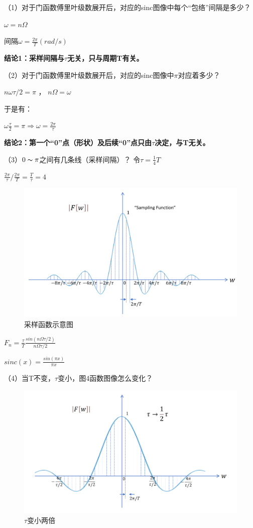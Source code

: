 \documentclass[UTF8]{ctexart}
\begin{document}
（1）对于门函数傅里叶级数展开后，对应的sinc图像中每个“包络”间隔是多少？\par
$\omega =n\Omega $ \par
间隔$\omega =\frac{2\pi}{T} (rad/s) $\par
\textbf{结论1：采样间隔与$\tau $无关，只与周期T有关。}\par
（2）对于门函数傅里叶级数展开后，对应的sinc图像中$\pi$对应着多少？\par
$n\omega\tau /2 =\pi $ ， $ n\Omega=\omega $  \par
于是有：\par
$\omega \frac{\tau }{2} =\pi \Longrightarrow \omega =\frac{2\pi}{\tau } $\par
\textbf{结论2：第一个“0”点（形状）及后续“0”点只由$\tau $决定，与T无关。}\par
（3）$0\thicksim \pi$之间有几条线（采样间隔）？ 令$\tau=\frac{1}{4} T $\par
$\frac{2\pi }{\tau }/\frac{2\pi }{T}=\frac{T}{\tau } =4  $\par
\begin{figure}[h]
    \centering         %
    \includegraphics[scale=0.4]{4.png}
    \caption{采样函数示意图}
\end{figure}
$F_n=\frac{\tau }{T}\frac{sin(n\Omega\tau /2)}{n\Omega\tau /2}  $\par
$sinc(x)=\frac{sin(\pi x)}{\pi x} $\par
（4）当T不变，$\tau$变小，图4函数图像怎么变化？\par
\begin{figure}[h]
    \centering         %
    \includegraphics[scale=0.4]{5.png}
    \caption{$\tau$变小两倍}
\end{figure}
\end{document}
